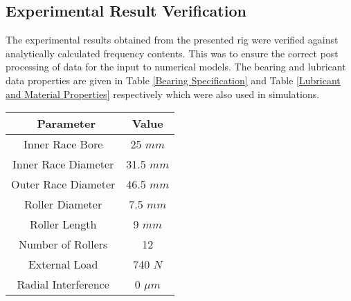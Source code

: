 \subsection{Experimental Result Verification}
The experimental results obtained from the presented rig were verified against analytically calculated frequency contents. This was to ensure the correct post processing of data for the input to numerical models. The bearing and lubricant data properties are given in Table \ref{Bearing Specification} and Table \ref{Lubricant and Material Properties} respectively which were also used in simulations.

\begin{table*}
	\caption{Bearing Specification}
	\label{Bearing Specification}
	\centering
	\renewcommand{\arraystretch}{1.5}%
	\begin{tabular}{|c|c|}
		\hline
		\ \textbf{Parameter} & \textbf{Value} \\ [0.5ex]
		\hline
		Inner Race Bore & 25 $mm$ \\ [0.5ex]
		\hline
		Inner Race Diameter & 31.5 $mm$ \\ [0.5ex]
		\hline
		Outer Race Diameter & 46.5 $mm$ \\ [0.5ex]
		\hline
		Roller Diameter & 7.5 $mm$ \\ [0.5ex]
		\hline
		Roller Length & 9 $mm$ \\ [0.5ex]
		\hline
		Number of Rollers & 12 \\ [0.5ex]
		\hline
		External Load & 740 $N$ \\ [0.5ex]
		\hline
		Radial Interference & 0 $\mu m$ \\ [0.5ex]
		\hline
	\end{tabular}
\end{table*}

